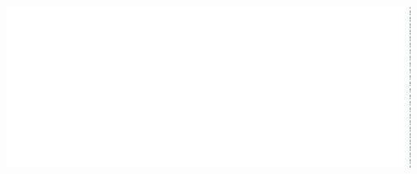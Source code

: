 \documentclass[12pt]{article}
\begin{document}
\begin{titlepage}
\begin{center}
    \vfill
    
    \includegraphics[width=0.5\linewidth]{kdglogo.png}
  \end{center}
\end{titlepage}


{ \hypersetup{hidelinks} \tableofcontents }
\newpage
{}



\newpage

\newpage

\newpage

\newpage

\newpage

\newpage

\newpage

\newpage

\newpage

\newpage

\newpage

\newpage
\end{document}

